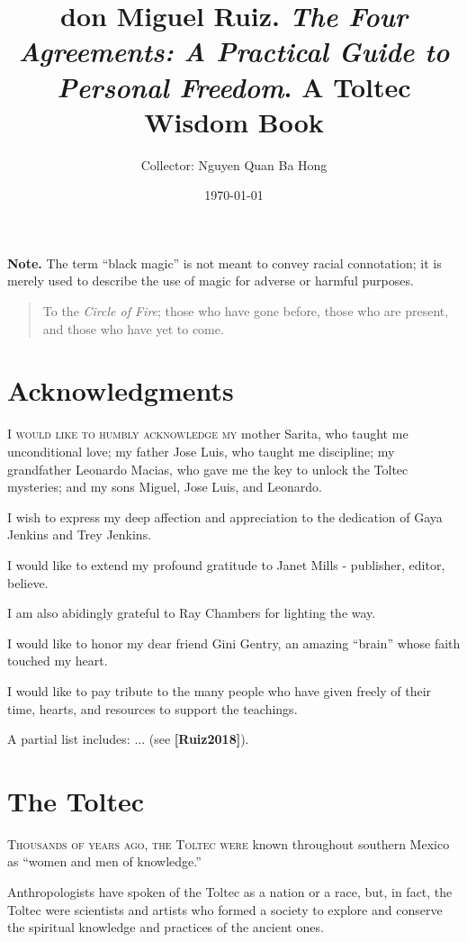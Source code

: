 \documentclass{article}
\title{don Miguel Ruiz. \textit{The Four Agreements: A Practical Guide to Personal Freedom}. A Toltec Wisdom Book}
\author{Collector: Nguyen Quan Ba Hong}
\date{\today}
\numberwithin{equation}{section}
\begin{document}
\maketitle
\setcounter{secnumdepth}{6}
\setcounter{tocdepth}{6}
\tableofcontents
\vspace{5mm}
\noindent
\textbf{Note.} The term ``black magic'' is not meant to convey racial connotation; it is merely used to describe the use of magic for adverse or harmful purposes.

\begin{quotation}
    To the \textit{Circle of Fire}; those who have gone before, those who are present, and those who have yet to come.
\end{quotation}


\section*{Acknowledgments}
\textsc{I would like to humbly acknowledge my} mother Sarita, who taught me unconditional love; my father Jose Luis, who taught me discipline; my grandfather Leonardo Macias, who gave me the key to unlock the Toltec mysteries; and my sons Miguel, Jose Luis, and Leonardo.

%
I wish to express my deep affection and appreciation to the dedication of Gaya Jenkins and Trey Jenkins.

%
I would like to extend my profound gratitude to Janet Mills - publisher, editor, believe.

I am also abidingly grateful to Ray Chambers for lighting the way.

%
I would like to honor my dear friend Gini Gentry, an amazing ``brain'' whose faith touched my heart.

%
I would like to pay tribute to the many people who have given freely of their time, hearts, and resources to support the teachings.

A partial list includes: $\ldots$ (see \textbf{[Ruiz2018]}).

\section*{The Toltec}
\textsc{Thousands of years ago, the Toltec were} known throughout southern Mexico as ``women and men of knowledge.''

Anthropologists have spoken of the Toltec as a nation or a race, but, in fact, the Toltec were scientists and artists who formed a society to explore and conserve the spiritual knowledge and practices of the ancient ones.
\end{document}
